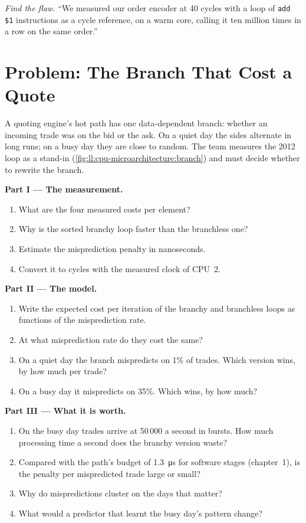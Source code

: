 \begin{exercise}[$\star\star\star$]\label{exo:ll:cpu-microarchitecture:8}
\emph{Find the flaw.} ``We measured our order encoder at 40 cycles with a loop of \texttt{add \$1} instructions as a
cycle reference, on a warm core, calling it ten million times in a row on the same order.''
\end{exercise}

\section{Problem: The Branch That Cost a Quote}

\begin{problem}\label{pb:ll:cpu-microarchitecture:1}
A quoting engine's hot path has one data-dependent branch: whether an incoming trade was on the bid or the ask. On a
quiet day the sides alternate in long runs; on a busy day they are close to random. The team measures the 2012 loop as
a stand-in (\cref{fig:ll:cpu-microarchitecture:branch}) and must decide whether to rewrite the branch.

\medskip\noindent\textbf{Part I --- The measurement.}
\begin{enumerate}
\item What are the four measured costs per element?
\item Why is the sorted branchy loop faster than the branchless one?
\item Estimate the misprediction penalty in nanoseconds.
\item Convert it to cycles with the measured clock of CPU~2.
\end{enumerate}

\medskip\noindent\textbf{Part II --- The model.}
\begin{enumerate}[resume]
\item Write the expected cost per iteration of the branchy and branchless loops as functions of the misprediction
rate.
\item At what misprediction rate do they cost the same?
\item On a quiet day the branch mispredicts on 1\% of trades. Which version wins, by how much per trade?
\item On a busy day it mispredicts on 35\%. Which wins, by how much?
\end{enumerate}

\medskip\noindent\textbf{Part III --- What it is worth.}
\begin{enumerate}[resume]
\item On the busy day trades arrive at 50\,000 a second in bursts. How much processing time a second does the branchy
version waste?
\item Compared with the path's budget of \qty{1.3}{\micro\second} for software stages (chapter~1), is the penalty per
mispredicted trade large or small?
\item Why do mispredictions cluster on the days that matter?
\item What would a predictor that learnt the busy day's pattern change?
\end{enumerate}


\end{problem}
